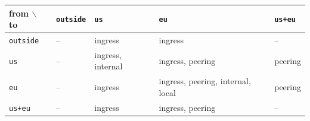 \begin{tabular}{@{}lllll@{}}
\toprule
from $\backslash$ to & \texttt{outside} & \texttt{us} & \texttt{eu} & \texttt{us+eu} \\
\midrule
\texttt{outside} & -- & ingress & ingress & -- \\
\texttt{us} & -- & ingress, internal & ingress, peering & peering \\
\texttt{eu} & -- & ingress & ingress, peering, internal, local & peering \\
\texttt{us+eu} & -- & ingress & ingress, peering & -- \\
\bottomrule
\end{tabular}
